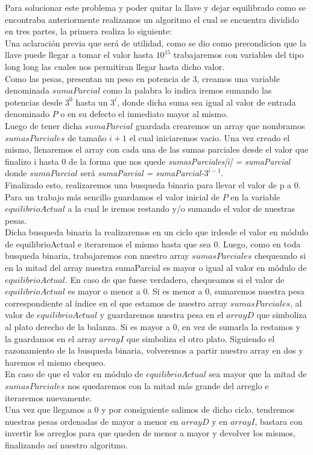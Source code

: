 
Para solucionar este problema y poder quitar la llave y dejar equilibrado como se encontraba anteriormente realizamos un algoritmo el cual se encuentra dividido en tres partes, la primera realiza lo siguiente:\\

Una aclaraci\'on previa que ser\'a de utilidad, como se dio como precondicion que la llave puede llegar a tomar el valor hasta $10^{15}$ trabajaremos con variables del tipo long long las cuales nos permitiran llegar hasta dicho valor.\\
 
Como las pesas, presentan un peso en potencia de 3, creamos una variable denominada $sumaParcial$ como la palabra lo indica iremos sumando las potencias desde $3^0$ hasta un $3^i$, donde dicha suma sea igual al valor de entrada denominado $P$ o en su defecto el inmediato mayor al mismo.\\

Luego de tener dicha $sumaParcial$ guardada crearemos un array que nombramos $sumasParciales$ de tamaño $i+1$ el cual iniciaremos vacio. Una vez creado el mismo, llenaremos el array con cada una de las sumas parciales desde el valor que finalizo i hasta 0 de la forma que nos quede \textit{sumasParciales[i] = sumaParcial} donde $sumaParcial$ ser\'a \textit{sumaParcial = sumaParcial-$3^{i-1}$}.\\

Finalizado esto, realizaremos una busqueda binaria para llevar el valor de p a 0. Para un trabajo m\'as sencillo guardamos el valor inicial de $P$ en la variable $equilibrioActual$ a la cual le iremos restando y/o sumando el valor de nuestras pesas.\\

Dicha busqueda binaria la realizaremos en un ciclo que ir\a desde el valor en m\'odulo de equilibrioActual e iteraremos el mismo hasta que sea 0. Luego, como en toda busqueda binaria, trabajaremos con nuestro array $sumasParciales$ chequeando si en la mitad del array nuestra sumaParcial es mayor o igual al valor en m\'odulo de $equilibrioActual$. En caso de que fuese verdadero, chequeamos si el valor de $equilibrioActual$ es mayor o menor a 0. Si es menor a 0, sumaremos nuestra pesa correspondiente al \'indice en el que estamos de nuestro array $sumasParciales$, al valor de $equilibrioActual$ y guardaremos nuestra pesa en el $arrayD$ que simboliza al plato derecho de la balanza. Si es mayor a 0, en vez de sumarla la restamos y la guardamos en el array $arrayI$ que simboliza el otro plato. Siguiendo el razonamiento de la busqueda binaria, volveremos a partir nuestro array en dos y haremos el mismo chequeo.\\

En caso de que el valor en m\'odulo de $equilibrioActual$ sea mayor que la mitad de $sumasParciales$ nos quedaremos con la mitad m\'as grande del arreglo e iteraremos nuevamente.\\

Una vez que llegamos a 0 y por consiguiente salimos de dicho ciclo, tendremos nuestras pesas ordenadas de mayor a menor en $arrayD$ y en $arrayI$, bastara con invertir los arreglos para que queden de menor a mayor y devolver los mismos, finalizando as\'i nuestro algoritmo.\\
